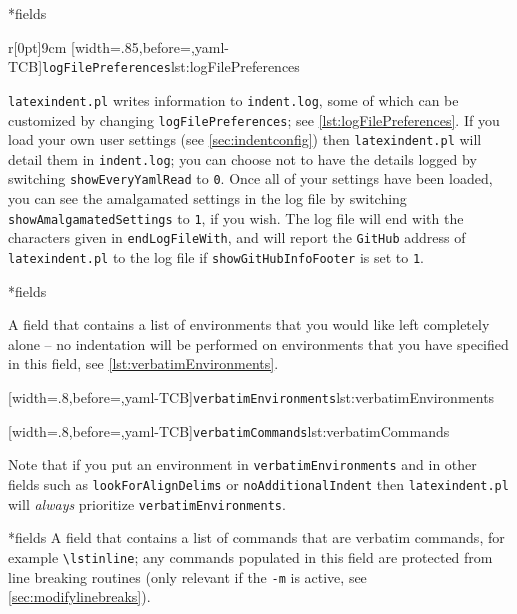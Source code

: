 *{fields}
	\begin{wrapfigure}[10]{r}[0pt]{9cm}
		[width=.85\linewidth,before=\centering,yaml-TCB]{\texttt{logFilePreferences}}{lst:logFilePreferences}
	\end{wrapfigure}
	\texttt{latexindent.pl} writes information to \texttt{indent.log}, some
	of which can be customized by changing \texttt{logFilePreferences}; see \cref{lst:logFilePreferences}.
	If you load your own user settings (see \vref{sec:indentconfig}) then \texttt{latexindent.pl} will
	detail them in \texttt{indent.log}; you can choose not to have the details logged by switching
	\texttt{showEveryYamlRead} to \texttt{0}. Once all of your settings have
	been loaded, you can see the amalgamated settings in the log file by switching \texttt{showAmalgamatedSettings}
	to \texttt{1}, if you wish. The log file will end with the characters
	given in \texttt{endLogFileWith}, and will report the \texttt{GitHub} address
	of \texttt{latexindent.pl} to the log file if \texttt{showGitHubInfoFooter} is set to \texttt{1}.

*{fields}

	A field that contains a list of environments
	that you would like left completely alone -- no indentation will be performed
	on environments that you have specified in this field, see \cref{lst:verbatimEnvironments}.

	\begin{minipage}{.45\textwidth}
		[width=.8\linewidth,before=\centering,yaml-TCB]{\texttt{verbatimEnvironments}}{lst:verbatimEnvironments}
	\end{minipage}%
	\hfill
	\begin{minipage}{.45\textwidth}
		[width=.8\linewidth,before=\centering,yaml-TCB]{\texttt{verbatimCommands}}{lst:verbatimCommands}
	\end{minipage}%

	Note that if  you put an environment in  \texttt{verbatimEnvironments}
	and in other fields such as \texttt{lookForAlignDelims} or \texttt{noAdditionalIndent}
	then \texttt{latexindent.pl} will \emph{always} prioritize  \texttt{verbatimEnvironments}.

*{fields}
	A field that contains a list of commands that are verbatim commands, for example
	\lstinline|\lstinline|; any commands populated in this field are protected from line breaking
	routines (only relevant if the \texttt{-m} is active, see \vref{sec:modifylinebreaks}).

